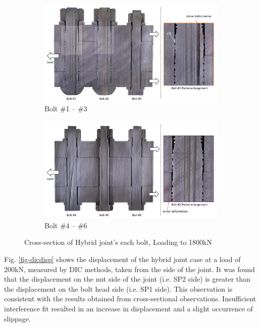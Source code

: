 \begin{figure}
    \centering
    \begin{subfigure}[t]{0.85\textwidth}
    \centering
    \includegraphics[width=\linewidth]{imgs/ch6/cros-sec-ob1.pdf}
    \caption{Bolt \#1 -- \#3}
    \label{fig-csob1}
    \end{subfigure}
    \begin{subfigure}[t]{0.85\textwidth}
    \centering
    \includegraphics[width=\linewidth]{imgs/ch6/cros-sec-ob2.pdf}
    \caption{Bolt \#4 -- \#6}
    \label{fig-csob2}
    \end{subfigure}
    \caption{Cross-section of Hybrid joint's each bolt, Loading to 1800kN}
    \label{fig-csob}
\end{figure}


Fig. \ref{fig-dicdisp} shows the displacement of the hybrid joint case at a load of 200kN, measured by DIC methods, taken from the side of the joint. It was found that the displacement on the nut side of the joint (i.e. SP2 side) is greater than the displacement on the bolt head side (i.e. SP1 side). This observation is consistent with the results obtained from cross-sectional observations. Insufficient interference fit resulted in an increase in displacement and a slight occurrence of slippage.

